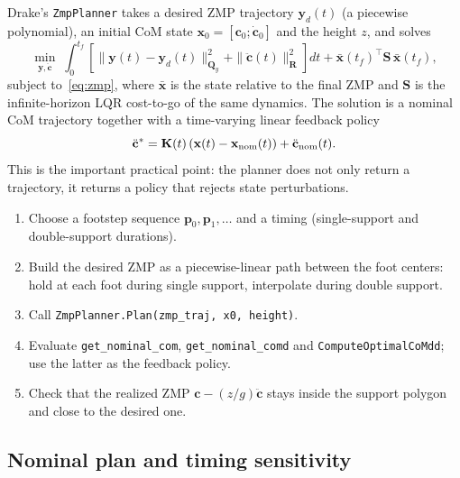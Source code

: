 \documentclass[11pt]{article}
\newcommand{\bx}{\mathbf{x}}
\newcommand{\bp}{\mathbf{p}}
\newcommand{\bQ}{\mathbf{Q}}
\newcommand{\bR}{\mathbf{R}}
\begin{document}
Drake's \texttt{ZmpPlanner} takes a desired ZMP trajectory
$\mathbf{y}_d(t)$ (a piecewise polynomial), an initial CoM state
$\bx_0=[\mathbf{c}_0;\dot{\mathbf{c}}_0]$ and the height $z$, and solves
\begin{equation}
\min_{\mathbf{y},\ddot{\mathbf{c}}}\;
\int_0^{t_f}\left[
\|\mathbf{y}(t)-\mathbf{y}_d(t)\|^2_{\bQ_y}
+\|\ddot{\mathbf{c}}(t)\|^2_{\bR}
\right]dt
+\bar{\bx}(t_f)^\top \mathbf{S}\,\bar{\bx}(t_f),
\label{eq:zmp_cost}
\end{equation}
subject to~\eqref{eq:zmp}, where $\bar{\bx}$ is the state relative to the final
ZMP and $\mathbf{S}$ is the infinite-horizon LQR cost-to-go of the same
dynamics.  The solution is a nominal CoM trajectory together with a
time-varying linear feedback policy
\begin{equation}
\ddot{\mathbf{c}}^*=\mathbf{K}(t)\left(\bx(t)-\bx_{\rm nom}(t)\right)
+\ddot{\mathbf{c}}_{\rm nom}(t).
\label{eq:zmp_policy}
\end{equation}
This is the important practical point: the planner does not only return a
trajectory, it returns a policy that rejects state perturbations.

\begin{recipe}[breakable=false,title={Building a ZMP plan from footsteps}]
\begin{enumerate}[leftmargin=1.4em,itemsep=2pt]
  \item Choose a footstep sequence $\bp_0,\bp_1,\dots$ and a timing
        (single-support and double-support durations).
  \item Build the desired ZMP as a piecewise-linear path between the foot
        centers: hold at each foot during single support, interpolate during
        double support.
  \item Call \texttt{ZmpPlanner.Plan(zmp\_traj, x0, height)}.
  \item Evaluate \texttt{get\_nominal\_com}, \texttt{get\_nominal\_comd} and
        \texttt{ComputeOptimalCoMdd}; use the latter as the feedback policy.
  \item Check that the realized ZMP $\mathbf{c}-(z/g)\ddot{\mathbf{c}}$ stays
        inside the support polygon and close to the desired one.
\end{enumerate}
\end{recipe}

\subsection{Nominal plan and timing sensitivity}
\end{document}
